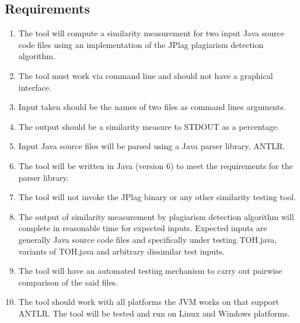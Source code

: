 \subsection{Requirements}
\begin{enumerate}
\item The tool will compute a similarity measurement for two input Java source code files using an implementation of the JPlag plagiarism detection algorithm.

\item The tool must work via command line and should not have a graphical interface.

\item Input taken should be the names of two files as command lines arguments.

\item The output should be a similarity measure to STDOUT as a percentage.

\item Input Java source files will be parsed using a Java parser library, ANTLR.

\item The tool will be written in Java (version 6) to meet the requirements for the parser library.

\item The tool will not invoke the JPlag binary or any other similarity testing tool.

\item The output of similarity measurement by plagiarism detection algorithm will complete in reasonable time for expected inputs. Expected inputs are generally Java source code files and specifically under testing TOH.java, variants of TOH.java and arbitrary dissimilar test inputs.

\item The tool will have an automated testing mechanism to carry out pairwise comparison of the said files.

\item The tool should work with all platforms the JVM works on that support ANTLR. The tool will be tested and run on Linux and Windows platforms.

\end{enumerate}
\break
